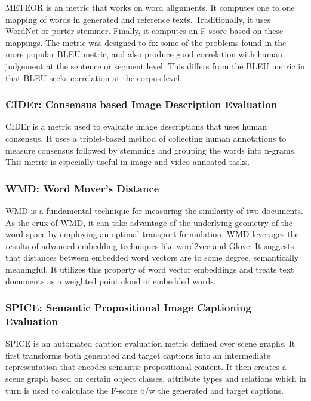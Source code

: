 \par METEOR \cite{meteor} is an metric that works on word alignments. It computes one to one mapping of words in generated and reference texts. Traditionally, it uses WordNet or porter stemmer. Finally, it computes an F-score based on these mappings. The metric was designed to fix some of the problems found in the more popular BLEU metric, and also produce good correlation with human judgement at the sentence or segment level. This differs from the BLEU metric in that BLEU seeks correlation at the corpus level.


\subsubsection{CIDEr: Consensus based Image Description Evaluation}

\par CIDEr \cite{cider} is a metric used to evaluate image descriptions that uses human consensus. It uses a triplet-based method of collecting human annotations to measure consensus followed by stemming and grouping the words into n-grams. This metric is especially useful in image and video annoated tasks.

\subsubsection{WMD: Word Mover's Distance}

\par WMD \cite{wmd} is a fundamental technique for measuring the similarity of two documents. As the crux of WMD, it can take advantage of the underlying geometry of the word space by employing an optimal transport formulation. WMD leverages the results of advanced embedding techniques like word2vec and Glove. It suggests that distances between embedded word vectors are to some degree, semantically meaningful. It utilizes this property of word vector embeddings and treats text documents as a weighted point cloud of embedded words. 

\subsubsection{SPICE: Semantic Propositional Image Captioning Evaluation}

\par SPICE \cite{spice} is an automated caption evaluation metric defined over scene graphs. It first transforms  both generated and target captions into an intermediate representation that encodes semantic propositional content. It then creates a scene graph based on certain object classes, attribute types and relations which in turn is used to calculate the F-score b/w the generated and target captions. 
